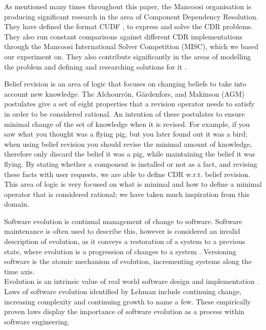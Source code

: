 As mentioned many times throughout this paper, 
the Mancoosi organisation is producing significant research in the area of Component Dependency Resolution.
They have defined the format CUDF \cite{treinen2009common}, to express and solve the CDR problems.
They also run constant comparisons against different CDR implementations through the Mancoosi International Solver Competition (MISC),
which we based our experiment on.
They also contribute significantly in the areas of modelling the problem \cite{Cosmo2010} 
and defining and researching solutions for it \cite{Trezentos2010}.

Belief revision is an area of logic that focuses on changing beliefs to take into account new knowledge.
The Alchourr\'on, G\"ardenfors, and Makinson (AGM) \cite{alchourron1985logic} postulates give a set of eight properties 
that a revision operator needs to satisfy in order to be considered rational.
An intention of these postulates to ensure minimal change of the set of knowledge when it is revised.
For example, if you saw what you thought was a flying pig, but you later found out it was a bird;
when using belief revision you should revise the minimal amount of knowledge, therefore only discard the belief it was a pig, 
while maintaining the belief it was flying.
By stating whether a component is installed or not as a fact,
and revising these facts with user requests, we are able to define CDR w.r.t. belief revision.
This area of logic is very focused on what is minimal and how to define a minimal operator that is considered rational; 
we have taken much inspiration from this domain.




Software evolution is continual management of change to software. 
Software maintenance is often used to describe this,
however is considered an invalid description of evolution, as it conveys a
restoration of a system to a previous state, where evolution is a progression
of changes to a system \cite{lehman_software_2006}. Versioning software is the atomic mechanism of evolution, 
incrementing systems along the time axis.\\ 
Evolution is an intrinsic value of real world software
design and implementation \cite{lehman_programs_1980}. Laws of software
evolution identified by Lehman include continuing change, increasing complexity and
continuing growth \cite{lehman_rules_2001} to name a few. These empirically proven laws
display the importance of software evolution as a process within software
engineering.

